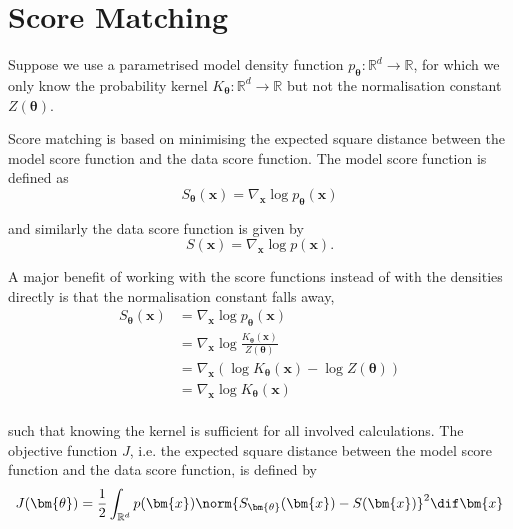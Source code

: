 
\begin{comment}
We have a dataset $\mathcal{D} = (\bm{x}_i)_{i = 1}^n \subseteq \mathbb{R}^d$ from an unknown distribution of a random vector $\bm{X} : \Omega \to \mathbb{R}^d$,
with some probability density function $p : \mathbb{R}^d \to \mathbb{R}$.
We want to use the data to approximate this density function with a parametrised model density function $p_{\bm{\theta}}: \mathbb{R}^d \to \mathbb{R}$,
for a vector of parameters $\bm{\theta} \in \mathbb{R}^m$, by estimating an optimal $\hat{\bm{\theta}}$ such that $p_{ \hat{\bm{\theta}} }$ is close to $p$.
\end{comment}

\newtheorem{theorem}{Theorem}

\section{Score Matching}

Suppose we use a parametrised model density function $p_{\bm{\theta}}: \mathbb{R}^d \to \mathbb{R}$, 
for which we only know the probability kernel $K_{\bm{\theta}}: \mathbb{R}^d \to \mathbb{R}$ but not the normalisation constant $Z(\bm{\theta})$.

Score matching is based on minimising the expected square distance between the model score function and the data score function.
The model score function is defined as
\[
	S_{\bm{\theta}} (\bm{x}) = \nabla_{\bm{x}} \log p_{\bm{\theta}}(\bm{x})
\]

and similarly the data score function is given by
\[
	S (\bm{x}) = \nabla_{\bm{x}} \log p(\bm{x}).
\]

A major benefit of working with the score functions instead of with the densities directly is that the normalisation constant falls away,
\[
\begin{aligned}
	S_{\bm{\theta}} (\bm{x}) 
	&= \nabla_{\bm{x}} \log p_{\bm{\theta}}(\bm{x}) \\
	&= \nabla_{\bm{x}} \log \frac{ K_{\bm{\theta}}(\bm{x}) }{ Z(\bm{\theta}) } \\
	&= \nabla_{\bm{x}} \left( \log K_{\bm{\theta}}(\bm{x}) - \log Z(\bm{\theta}) \right) \\
	&= \nabla_{\bm{x}} \log K_{\bm{\theta}}(\bm{x}) \\
\end{aligned}
\]

such that knowing the kernel is sufficient for all involved calculations.
The objective function $J$, i.e. the expected square distance between the model score function and the data score function, is defined by
\[
	J(\bm{\theta}) = \frac{1}{2} \int_{\mathbb{R}^d} p(\bm{x}) \norm{ S_{\bm{\theta}} (\bm{x}) - S (\bm{x}) }^2 \dif \bm{x}
\]

